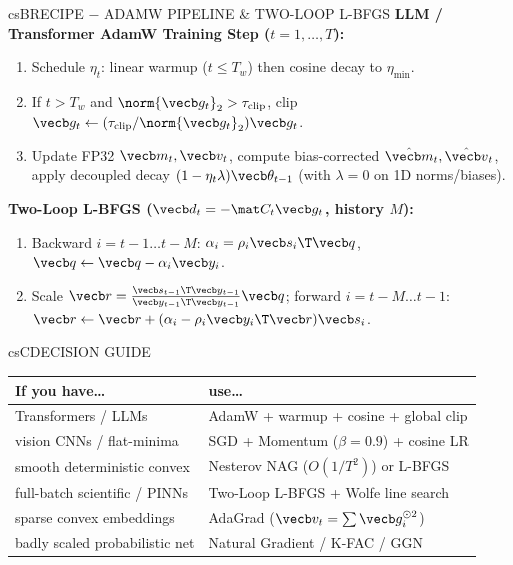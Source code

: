 \documentclass[../../../../master.tex]{subfiles}
\begin{document}
\begin{cscolumns}
\begin{cscard}{csB}{RECIPE $-$ ADAMW PIPELINE \& TWO-LOOP L-BFGS}
  \footnotesize
  \textbf{LLM / Transformer AdamW Training Step ($t=1,\dots,T$):}
  \begin{enumerate}[leftmargin=1.2em, itemsep=0.5pt, topsep=1pt, parsep=0pt]
    \item Schedule $\eta_t$: linear warmup ($t\le T_w$) then cosine decay to $\eta_{\min}$.
    \item If $t>T_w$ and $\norm{\vecb g_t}_2>\tau_{\mathrm{clip}}$, clip $\vecb g_t\gets(\tau_{\mathrm{clip}}/\norm{\vecb g_t}_2)\vecb g_t$.
    \item Update FP32 $\vecb m_t,\vecb v_t$, compute bias-corrected $\hat{\vecb m}_t,\hat{\vecb v}_t$, apply decoupled decay $(1-\eta_t\lambda)\vecb\theta_{t-1}$ (with $\lambda=0$ on 1D norms/biases).
  \end{enumerate}
  \vspace{1pt}
  \textbf{Two-Loop L-BFGS ($\vecb d_t=-\mat C_t\vecb g_t$, history $M$):}
  \begin{enumerate}[leftmargin=1.2em, itemsep=0.5pt, topsep=1pt, parsep=0pt]
    \item Backward $i=t{-}1\dots t{-}M$: $\alpha_i=\rho_i\vecb s_i\T\vecb q$, $\vecb q\gets\vecb q-\alpha_i\vecb y_i$.
    \item Scale $\vecb r=\frac{\vecb s_{t-1}\T\vecb y_{t-1}}{\vecb y_{t-1}\T\vecb y_{t-1}}\vecb q$; forward $i=t{-}M\dots t{-}1$: $\vecb r\gets\vecb r+(\alpha_i-\rho_i\vecb y_i\T\vecb r)\vecb s_i$.
  \end{enumerate}
\end{cscard}
\columnbreak

\begin{cscard}{csC}{DECISION GUIDE}
  \renewcommand{\arraystretch}{1.14}\footnotesize
  \begin{tabular}{@{}>{\raggedright\arraybackslash}p{3.1cm}>{\raggedright\arraybackslash}p{4.6cm}@{}}
    \textbf{If you have\ldots} & \textbf{use\ldots}\\ \hline
    Transformers / LLMs & AdamW + warmup + cosine + global clip\\
    vision CNNs / flat-minima & SGD + Momentum ($\beta=0.9$) + cosine LR\\
    smooth deterministic convex & Nesterov NAG ($O(1/T^2)$) or L-BFGS\\
    full-batch scientific / PINNs & Two-Loop L-BFGS + Wolfe line search\\
    sparse convex embeddings & AdaGrad ($\vecb v_t=\sum\vecb g_i^{\odot 2}$)\\
    badly scaled probabilistic net & Natural Gradient / K-FAC / GGN\\
  \end{tabular}
\end{cscard}


\end{cscolumns}
\end{document}
